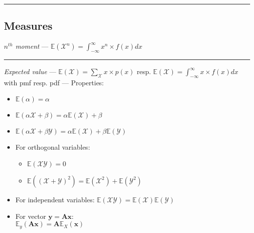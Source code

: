 {\color{black}\hrule height 0.001mm}

\subsection*{Measures}
\emph{$n^{th}$ moment} --- 
$\mathbb{E}(\mathcal{X}^n) = \int_{-\infty}^{\infty}x^n \times f(x)dx$

{\color{lightgray}\hrule height 0.001mm}

\emph{Expected value} --- 
$\mathbb{E}(\mathcal{X}) = \sum_{\mathcal{X}}x \times p(x)$ resp. $\mathbb{E}(\mathcal{X}) = \int_{-\infty}^{\infty}x \times f(x)dx$ with pmf resp. pdf --- Properties:
\begin{multicols}{2}
\begin{itemize}
    \item $\mathbb{E}(\alpha)=\alpha$
    \item $\mathbb{E}(\alpha\mathcal{X}+\beta)=\alpha\mathbb{E}(\mathcal{X})+\beta$
    \item $\mathbb{E}(\alpha\mathcal{X} + \beta\mathcal{Y})=\alpha\mathbb{E}(\mathcal{X})+\beta\mathbb{E}(\mathcal{Y})$
    \item For orthogonal variables:
    \begin{itemize}
        \item  $\mathbb{E}(\mathcal{X}\mathcal{Y})=0$
        \item $\mathbb{E}((\mathcal{X}+\mathcal{Y})^2)=\mathbb{E}(\mathcal{X}^2) + \mathbb{E}(\mathcal{Y}^2)$
    \end{itemize}
    \item For independent variables: $\mathbb{E}(\mathcal{X}\mathcal{Y})=\mathbb{E}(\mathcal{X})\mathbb{E}(\mathcal{Y})$
    \item For vector $\boldsymbol{y} = \boldsymbol{A}\boldsymbol{x}$:\\
    $\mathbb{E}_y(\boldsymbol{A}\boldsymbol{x})=\boldsymbol{A}\mathbb{E}_X(\boldsymbol{x})$
\end{itemize}
\end{multicols}
